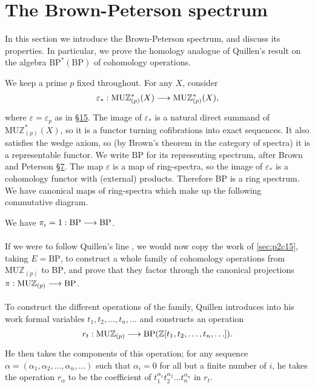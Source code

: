 \documentclass[../main]{subfiles}
\begin{document}
\label{sec:p2c16}
\chapter{The Brown-Peterson spectrum}
In this section we introduce the Brown-Peterson spectrum, and discuss its properties. In particular, we prove the homology analogue of Quillen's result on the algebra $\mathrm{BP}^\ast(\mathrm {BP})$ of cohomology operations.

We keep a prime $p$ fixed throughout. For any $X$, consider \[\varepsilon_\ast : \mathrm{MU} \mathbb Z_{(p)}^\ast(X) \lar{} \mathrm{MU} \mathbb Z_{(p)}^\ast(X),\] where $\varepsilon = \varepsilon_p$ as in \hyperref[sec:p2c15]{\S 15}. The image of $\varepsilon_\ast$ is a natural direct summand of $\mathrm {MU} \mathbb Z_{(p)}^\ast(X)$, so it is a functor turning cofibrations into exact sequences. It also satisfies the wedge axiom, so (by Brown's theorem in the category of spectra) it is a representable functor. We write $\mathrm{BP}$ for its representing spectrum, after Brown and Peterson \hyperref[sec:p2c7]{\S 7}. The map $\varepsilon$ is a map of ring-spectra, so the image of $\varepsilon_\ast$ is a cohomology functor with (external) products. Therefore BP is a ring spectrum. We have canonical maps of ring-spectra which make up the following commutative diagram. 

\begin{center}
\end{center}

We have $\pi_\iota = 1 : \mathrm{BP} \lar{} \mathrm{BP}$.

If we were to follow Quillen's line \cite{quillen}, we would now copy the work of \ref{sec:p2c15}, taking $E = \mathrm{BP}$, to construct a whole family of cohomology operations from $\mathrm{MU} \mathbb Z_{(p)}$ to $\mathrm{BP}$, and prove that they factor through the canonical projections $\pi : \mathrm{MU} \mathbb Z_{(p)} \lar{} \mathrm{BP}$. 

To construct the different operations of the family, Quillen introduces into his work formal variables $t_1, t_2, \ldots, t_n, \ldots$ and constructs an operation \[r_t : \mathrm{MU} \mathbb Z_{(p)} \lar{} \mathrm{BP}(\mathbb Z[t_1, t_2, \ldots, t_n, \ldots]).\] He then takes the components of this operation; for any sequence $\alpha = (\alpha_1, \alpha_2, \ldots, \alpha_n, \ldots)$ such that $\alpha_i = 0$ for all but a finite number of $i$, he takes the operation $r_\alpha$ to be the coefficient of $t_1^{\alpha_1} t_2^{\alpha_2} \ldots t_n^{\alpha_n}$ in $r_t$. 
\end{document}
